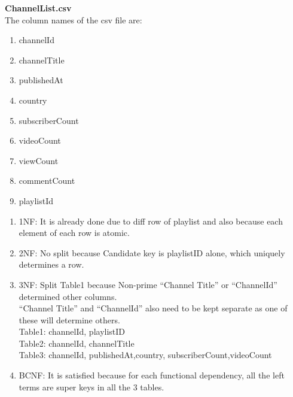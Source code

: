 \documentclass[10pt]{article}
\begin{document}
	\textbf{ChannelList.csv}\\
	The column names of the csv file are:
	\begin{enumerate}
		\item channelId
		\item channelTitle
		\item publishedAt
		\item country
		\item subscriberCount
		\item videoCount
		\item viewCount
		\item commentCount
		\item playlistId
	\end{enumerate}
	\begin{enumerate}
		\item 1NF: It is already done due to diff row of playlist  and also because each element of each row is atomic.
		\item 2NF: No split because Candidate key is playlistID alone, which uniquely determines a row.
		\item 3NF: Split Table1 because Non-prime “Channel Title” or “ChannelId” determined other columns.\\
		“Channel Title” and “ChannelId” also need to be kept separate as one of these will determine others.\\
		Table1: channelId, playlistID\\
		Table2: channelId,	channelTitle\\
		Table3: channelId,	publishedAt,country, subscriberCount,videoCount
		\item BCNF: It is satisfied because for each functional dependency, all the left terms are super keys in all the 3 tables.
	\end{enumerate}
\end{document}
